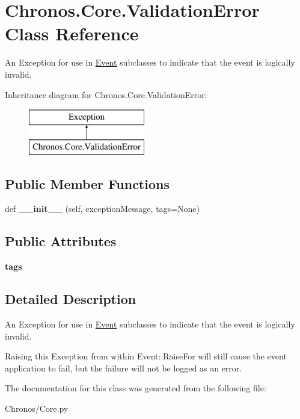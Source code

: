 \hypertarget{classChronos_1_1Core_1_1ValidationError}{}\section{Chronos.\+Core.\+Validation\+Error Class Reference}
\label{classChronos_1_1Core_1_1ValidationError}


An Exception for use in \hyperlink{classChronos_1_1Core_1_1Event}{Event} subclasses to indicate that the event is logically invalid.  


Inheritance diagram for Chronos.\+Core.\+Validation\+Error\+:\begin{figure}[H]
\begin{center}
\leavevmode
\includegraphics[height=2.000000cm]{classChronos_1_1Core_1_1ValidationError}
\end{center}
\end{figure}
\subsection*{Public Member Functions}
\begin{DoxyCompactItemize}
\item 
def {\bfseries \+\_\+\+\_\+init\+\_\+\+\_\+} (self, exception\+Message, tags=None)
\end{DoxyCompactItemize}
\subsection*{Public Attributes}
\begin{DoxyCompactItemize}
\item 
{\bfseries tags}
\end{DoxyCompactItemize}


\subsection{Detailed Description}
An Exception for use in \hyperlink{classChronos_1_1Core_1_1Event}{Event} subclasses to indicate that the event is logically invalid. 

Raising this Exception from within Event\+::\+Raise\+For will still cause the event application to fail, but the failure will not be logged as an error. 

The documentation for this class was generated from the following file\+:\begin{DoxyCompactItemize}
\item 
Chronos/Core.\+py\end{DoxyCompactItemize}
